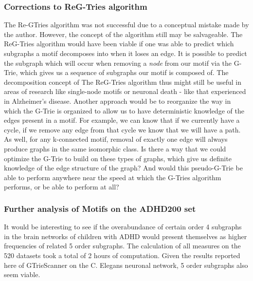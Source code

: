 \subsubsection{Corrections to ReG-Tries algorithm}
The Re-GTries algorithm was not successful due to a conceptual mistake made by the author. However, the concept of the algorithm still may be salvageable. The ReG-Tries algorithm would have been viable if one was able to predict which subgraphs a motif decomposes into when it loses an edge. It is possible to predict the subgraph which will occur when removing a \textit{node} from our motif via the G-Trie, which gives us a sequence of subgraphs our motif is composed of. The decomposition concept of The ReG-Tries algorithm thus might still be useful in areas of research like single-node motifs \cite{echtermeyer11} or neuronal death - like that experienced in Alzheimer's disease. Another approach would be to reorganize the way in which the G-Trie is organized to allow us to have deterministic knowledge of the edges present in a motif. For example, we can know that if we currently have a cycle, if we remove any edge from that cycle we know that we will have a path. As well, for any k-connected motif, removal of exactly one edge will always produce graphs in the same isomorphic class. Is there a way that we could optimize the G-Trie to build on these types of graphs, which give us definite knowledge of the edge structure of the graph? And would this pseudo-G-Trie be able to perform anywhere near the speed at which the G-Tries algorithm performs, or be able to perform at all? 
\subsubsection{Further analysis of Motifs on the ADHD200 set}
It would be interesting to see if the overabundance of certain order 4 subgraphs in the brain networks of children with ADHD would present themselves as higher frequencies of related 5 order subgraphs. The calculation of all measures on the 520 datasets took a total of 2 hours of computation. Given the results reported here of GTrieScanner on the C. Elegans neuronal network, 5 order subgraphs also seem viable. 